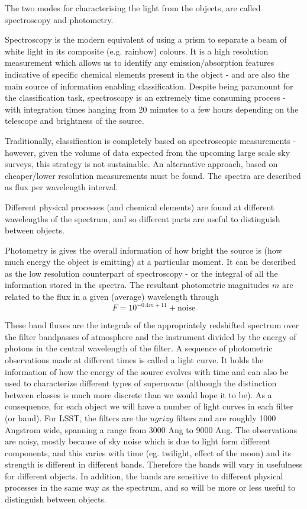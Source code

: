 \documentclass[\docopts]{\docclass}
\begin{document}
The two modes for characterising the light from the objects, are called spectroscopy and photometry.

Spectroscopy is the modern equivalent of using a prism to separate a beam of white light in its composite (e.g. rainbow) colours. It is a high resolution measurement which allows us to identify any emission/absorption features indicative of specific chemical elements present in the object - and are also the main source of information enabling classification. Despite being paramount for the classification task, spectroscopy is an extremely time consuming process - with integration times hanging from 20 minutes to a few hours depending on the telescope and brightness of the source.

Traditionally, classification is completely based on spectroscopic measurements - however, given the volume of data expected from the upcoming large scale sky surveys, this strategy is not sustainable. An alternative approach, based on cheaper/lower resolution measurements must be found. The spectra are described as flux per wavelength interval. 

Different physical processes (and chemical elements) are found at different wavelengths of the spectrum, and so different parts are useful to distinguish between objects.

Photometry is gives the overall information of how bright the source is (how much energy the object is emitting) at a particular moment. It can be described as the low resolution counterpart of spectroscopy - or the integral of all the information stored in the spectra. The resultant photometric magnitudes $m$ are related to the flux in a given (average) wavelength through 
\begin{equation}
F = 10^{-0.4m+11} + \mbox{noise}
\end{equation}

These band fluxes are the integrals of the appropriately redshifted spectrum over the filter bandpasses of atmosphere and the instrument divided by the energy of photons in the central wavelength of the filter. A sequence of photometric observations made at different times is called a light curve. It holds the information of how the energy of the source evolves with time and can also be used to characterize different types of supernovae (although the distinction between classes is much more discrete than we would hope it to be). As a consequence, for each object we will have a number of light curves in each filter (or band). For LSST, the filters are the $ugrizy$ filters and are roughly 1000 Angstrom wide, spanning a range from 3000 Ang to 9000 Ang. The observations are noisy, mostly because of sky noise which is due to light form different components, and this varies with time (eg. twilight, effect of the moon) and its strength is different in different bands. Therefore the bands will vary in usefulness for different objects. In addition, the bands are sensitive to different physical processes in the same way as the spectrum, and so will be more or less useful to distinguish between objects.
\end{document}

